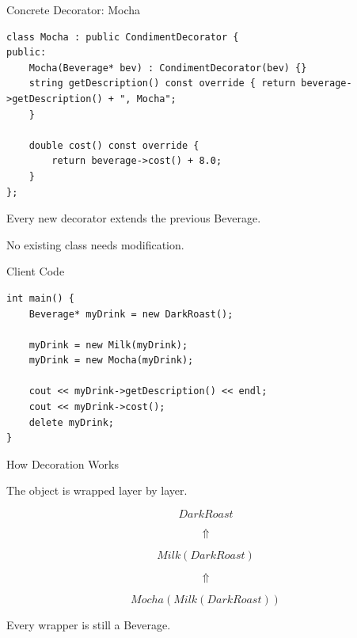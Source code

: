 \documentclass[aspectratio=169]{beamer}
\begin{document}

\begin{frame}[fragile]{Concrete Decorator: Mocha}

\begin{lstlisting}
class Mocha : public CondimentDecorator {
public:
    Mocha(Beverage* bev) : CondimentDecorator(bev) {}
    string getDescription() const override { return beverage->getDescription() + ", Mocha";
    }

    double cost() const override {
        return beverage->cost() + 8.0;
    }
};
\end{lstlisting}

\pause

Every new decorator extends the previous Beverage.

No existing class needs modification.

\end{frame}


\begin{frame}[fragile]{Client Code}

\begin{lstlisting}
int main() {
    Beverage* myDrink = new DarkRoast();

    myDrink = new Milk(myDrink);
    myDrink = new Mocha(myDrink);

    cout << myDrink->getDescription() << endl;
    cout << myDrink->cost();
    delete myDrink;
}
\end{lstlisting}

\end{frame}


\begin{frame}{How Decoration Works}

The object is wrapped layer by layer.

\bigskip

\[
DarkRoast
\]

\[
\Uparrow
\]

\[
Milk(DarkRoast)
\]

\[
\Uparrow
\]

\[
Mocha(Milk(DarkRoast))
\]

\pause

Every wrapper is still a Beverage.

\end{frame}
\end{document}
